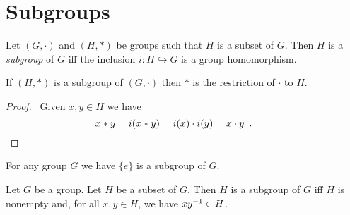 \section{Subgroups}

\begin{df}[Subgroup]
Let $(G,\cdot)$ and $(H,*)$ be groups such that $H$ is a subset of $G$. Then $H$ is a \emph{subgroup} of $G$ iff the inclusion $i : H \hookrightarrow G$ is a group homomorphism.
\end{df}

\begin{prop}
If $(H,*)$ is a subgroup of $(G,\cdot)$ then $*$ is the restriction of $\cdot$ to $H$.
\end{prop}

\begin{proof}
\pf\ Given $x,y \in H$ we have
\[ x * y = i(x * y) = i(x) \cdot i(y) = x \cdot y \enspace .  \qquad \qed \]
\end{proof}

\begin{ex}
For any group $G$ we have $\{e\}$ is a subgroup of $G$.
\end{ex}

\begin{prop}
Let $G$ be a group. Let $H$ be a subset of $G$. Then $H$ is a subgroup of $G$ iff $H$ is nonempty and, for all $x,y \in H$, we have $x \inv{y} \in H$.
\end{prop}

